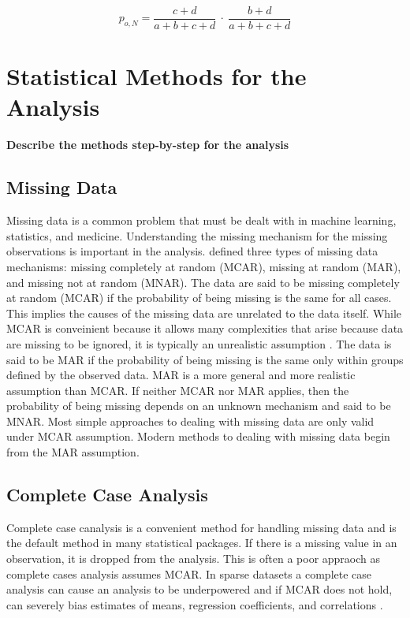 \documentclass[12pt,]{article}
\begin{document}
\[
p_{o,N} = \frac{c+d}{a+b+c+d} ~\cdot~ \frac{b+d}{a+b+c+d}
\]

\newpage

\section{Statistical Methods for the
Analysis}\label{statistical-methods-for-the-analysis}

\textbf{Describe the methods step-by-step for the analysis}

\subsection{Missing Data}\label{missing-data}

Missing data is a common problem that must be dealt with in machine
learning, statistics, and medicine. Understanding the missing mechanism
for the missing observations is important in the analysis.
\citep{rubin_inference_1976} defined three types of missing data
mechanisms: missing completely at random (MCAR), missing at random
(MAR), and missing not at random (MNAR). The data are said to be missing
completely at random (MCAR) if the probability of being missing is the
same for all cases. This implies the causes of the missing data are
unrelated to the data itself. While MCAR is conveinient because it
allows many complexities that arise because data are missing to be
ignored, it is typically an unrealistic assumption
\citep{van_buuren_flexible_2012}. The data is said to be MAR if the
probability of being missing is the same only within groups defined by
the observed data. MAR is a more general and more realistic assumption
than MCAR. If neither MCAR nor MAR applies, then the probability of
being missing depends on an unknown mechanism and said to be MNAR. Most
simple approaches to dealing with missing data are only valid under MCAR
assumption. Modern methods to dealing with missing data begin from the
MAR assumption.

\subsection{Complete Case Analysis}\label{complete-case-analysis}

Complete case canalysis is a convenient method for handling missing data
and is the default method in many statistical packages. If there is a
missing value in an observation, it is dropped from the analysis. This
is often a poor appraoch as complete cases analysis assumes MCAR. In
sparse datasets a complete case analysis can cause an analysis to be
underpowered and if MCAR does not hold, can severely bias estimates of
means, regression coefficients, and correlations
\citep{van_buuren_flexible_2012}.
\end{document}
